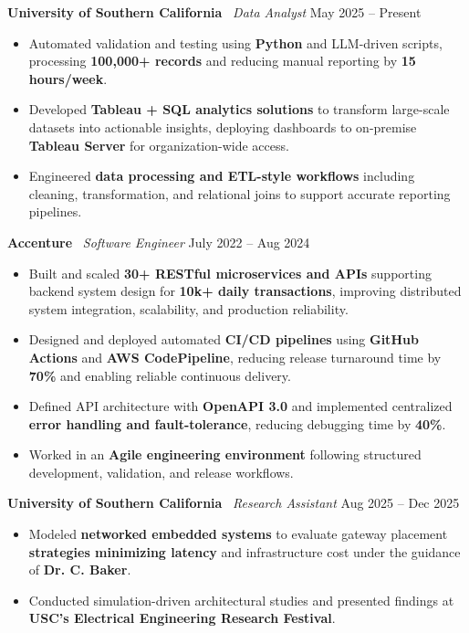 \documentclass[letterpaper,11pt]{article}
\begin{document}
\textbf{University of Southern California} \textbar\ \textit{Data Analyst} \hfill May 2025 -- Present
\begin{itemize} \itemsep -2pt
    \item Automated validation and testing using \textbf{Python} and LLM-driven scripts, processing \textbf{100,000+ records} and reducing manual reporting by \textbf{15 hours/week}.
    \item Developed \textbf{Tableau + SQL analytics solutions} to transform large-scale datasets into actionable insights, deploying dashboards to on-premise \textbf{Tableau Server} for organization-wide access.
    \item Engineered \textbf{data processing and ETL-style workflows} including cleaning, transformation, and relational joins to support accurate reporting pipelines.
\end{itemize}

\textbf{Accenture} \textbar\ \textit{Software Engineer} \hfill July 2022 -- Aug 2024
\begin{itemize} \itemsep -2pt
    \item Built and scaled \textbf{30+ RESTful microservices and APIs} supporting backend system design for \textbf{10k+ daily transactions}, improving distributed system integration, scalability, and production reliability.
    \item Designed and deployed automated \textbf{CI/CD pipelines} using \textbf{GitHub Actions} and \textbf{AWS CodePipeline}, reducing release turnaround time by \textbf{70\%} and enabling reliable continuous delivery.
    \item Defined API architecture with \textbf{OpenAPI 3.0} and implemented centralized \textbf{error handling and fault-tolerance}, reducing debugging time by \textbf{40\%}.
    \item Worked in an \textbf{Agile engineering environment} following structured development, validation, and release workflows.
\end{itemize}

\textbf{University of Southern California} \textbar\ \textit{Research Assistant} \hfill Aug 2025 -- Dec 2025
\begin{itemize} \itemsep -2pt
    \item Modeled \textbf{networked embedded systems} to evaluate gateway placement \textbf{strategies minimizing latency} and infrastructure cost under the guidance of \textbf{Dr. C. Baker}.
    \item Conducted simulation-driven architectural studies and presented findings at \textbf{USC’s Electrical Engineering Research Festival}.
\end{itemize}
\end{document}
